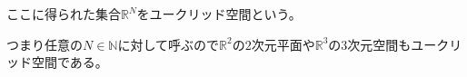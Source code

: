 \documentclass[a4j, 9pt]{ltjsarticle}
\def\ds{\displaystyle}
\begin{document}
\begin{multicols}{2}
          
          ここに得られた集合$\ds \mathbb{R}^N$をユークリッド空間という。\par
          つまり任意の$\ds N \in \mathbb{N}$に対して呼ぶので$\ds \mathbb{R}^2$の$\ds 2$次元平面や$\ds \mathbb{R}^3$の$\ds 3$次元空間もユークリッド空間である。
      
    \end{multicols}

  \newpage
\end{document}

